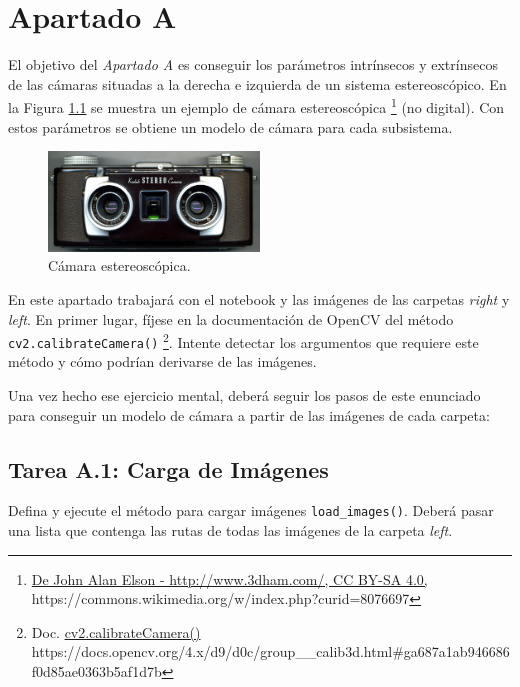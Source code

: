 \chapter{Apartado A}
\label{chapter:tarea_a}

El objetivo del \textit{Apartado A} es conseguir los parámetros intrínsecos y extrínsecos de las cámaras situadas a la derecha e izquierda de un sistema estereoscópico. En la Figura \ref{fig:stereo_camera} se muestra un ejemplo de cámara estereoscópica \footnote{ \href{https://commons.wikimedia.org/w/index.php?curid=8076697}{De John Alan Elson - http://www.3dham.com/, CC BY-SA 4.0, } https://commons.wikimedia.org/w/index.php?curid=8076697} (no digital). Con estos parámetros se obtiene un modelo de cámara para cada subsistema.

\begin{figure}[h]
    \centering
    \includegraphics[width=0.5\textwidth]{Lab_2/template/figures/stereo_camera.jpg}
    \caption{Cámara estereoscópica.}
    \label{fig:stereo_camera}
\end{figure}

En este apartado trabajará con el notebook y las imágenes de las carpetas \textit{right} y \textit{left}. En primer lugar, fíjese en la documentación de OpenCV del método \texttt{cv2.calibrateCamera()} \footnote{Doc. \href{https://docs.opencv.org/4.x/d9/d0c/group\_\_calib3d.html\#ga687a1ab946686f0d85ae0363b5af1d7b}{cv2.calibrateCamera()} https://docs.opencv.org/4.x/d9/d0c/group\_\_calib3d.html\#ga687a1ab946686f0d85ae0363b5af1d7b}. Intente detectar los argumentos que requiere este método y cómo podrían derivarse de las imágenes. 

Una vez hecho ese ejercicio mental, deberá seguir los pasos de este enunciado para conseguir un modelo de cámara a partir de las imágenes de cada carpeta:



\section*{Tarea A.1: Carga de Imágenes}
Defina y ejecute el método para cargar imágenes \texttt{load\_images()}. Deberá pasar una lista que contenga las rutas de todas las imágenes de la carpeta \textit{left}.

